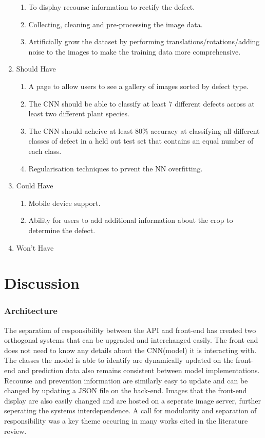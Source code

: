 \begin{enumerate}
\begin{enumerate}
      	\item To display recourse information to rectify the defect.\checkmark
      	\item Collecting, cleaning and pre-processing the image data. \checkmark
        \item Artificially grow the dataset by performing translations/rotations/adding noise to the images to make the training data more comprehensive.\checkmark
      \end{enumerate}
      \item Should Have
      \begin{enumerate}
        \item A page to allow users to see a gallery of images sorted by
          defect type. \checkmark
        \item The CNN should be able to classify at least 7 different defects across at least two different plant species. \checkmark
        \item The CNN should acheive at least 80\% accuracy at classifying all different classes of defect in a held out test set that contains an equal number of each class. \checkmark
      	\item Regularisation techniques to prvent the NN overfitting. \checkmark
      \end{enumerate}
      \item Could Have
      \begin{enumerate}
          \item Mobile device support. \checkmark
        \item Ability for users to add additional information about the crop
          to determine the defect.
      \end{enumerate}
      \item Won't Have
    \end{enumerate}

\section{Discussion}
\subsubsection{Architecture}
  The separation of responsibility between the API and front-end has created two orthogonal systems that can be upgraded and interchanged easily. The front end does not need to know any details about the CNN(model) it is interacting with. The classes the model is able to identify are dynamically updated on the front-end and prediction data also remains consistent between model implementations. Recourse and prevention information are similarly easy to update and can be changed by updating a JSON file on the back-end. Images that the front-end display are also easily changed and are hosted on a seperate image server, further seperating the systems interdependence. A call for modularity and separation of responsibility was a key theme occuring in many works cited in the literature review.

